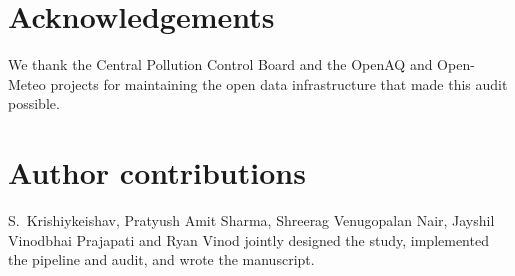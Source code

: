 \section*{Acknowledgements}
We thank the Central Pollution Control Board and the OpenAQ and Open-Meteo projects for
maintaining the open data infrastructure that made this audit possible.

\section*{Author contributions}
S.~Krishiykeishav, Pratyush Amit Sharma, Shreerag Venugopalan Nair, Jayshil Vinodbhai
Prajapati and Ryan Vinod jointly designed the study, implemented the pipeline and
audit, and wrote the manuscript.

